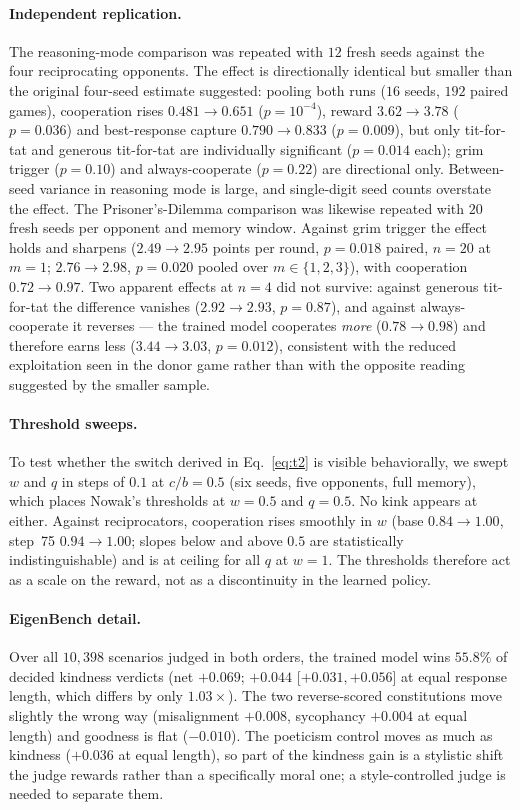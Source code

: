 \documentclass{article}
\begin{document}
\paragraph{Independent replication.} The reasoning-mode comparison was
repeated with $12$ fresh seeds against the four reciprocating opponents. The
effect is directionally identical but smaller than the original four-seed
estimate suggested: pooling both runs ($16$ seeds, $192$ paired games),
cooperation rises $0.481\to0.651$ ($p{=}10^{-4}$), reward $3.62\to3.78$
($p{=}0.036$) and best-response capture $0.790\to0.833$ ($p{=}0.009$), but
only tit-for-tat and generous tit-for-tat are individually significant
($p{=}0.014$ each); grim trigger ($p{=}0.10$) and always-cooperate
($p{=}0.22$) are directional only. Between-seed variance in reasoning mode is
large, and single-digit seed counts overstate the effect. The
Prisoner's-Dilemma comparison was likewise repeated with $20$ fresh seeds per
opponent and memory window. Against grim
trigger the effect holds and sharpens ($2.49\to2.95$ points per round,
$p{=}0.018$ paired, $n{=}20$ at $m{=}1$; $2.76\to2.98$, $p{=}0.020$ pooled
over $m\in\{1,2,3\}$), with cooperation $0.72\to0.97$. Two apparent effects at
$n{=}4$ did not survive: against generous tit-for-tat the difference vanishes
($2.92\to2.93$, $p{=}0.87$), and against always-cooperate it reverses --- the
trained model cooperates \emph{more} ($0.78\to0.98$) and therefore earns less
($3.44\to3.03$, $p{=}0.012$), consistent with the reduced exploitation seen in
the donor game rather than with the opposite reading suggested by the smaller
sample.

\paragraph{Threshold sweeps.} To test whether the switch derived in
Eq.~\ref{eq:t2} is visible behaviorally, we swept $w$ and $q$ in steps of
$0.1$ at $c/b=0.5$ (six seeds, five opponents, full memory), which places
Nowak's thresholds at $w=0.5$ and $q=0.5$. No kink appears at either. Against
reciprocators, cooperation rises smoothly in $w$ (base $0.84\to1.00$, step~75
$0.94\to1.00$; slopes below and above $0.5$ are statistically
indistinguishable) and is at ceiling for all $q$ at $w=1$. The thresholds
therefore act as a scale on the reward, not as a discontinuity in the learned
policy.

\paragraph{EigenBench detail.} Over all $10{,}398$ scenarios judged in both
orders, the trained model wins $55.8\%$ of decided kindness verdicts (net
$+0.069$; $+0.044$ [$+0.031,+0.056$] at equal response length, which differs by
only $1.03\times$). The two reverse-scored constitutions move slightly the
wrong way (misalignment $+0.008$, sycophancy $+0.004$ at equal length) and
goodness is flat ($-0.010$). The poeticism control moves as much as kindness
($+0.036$ at equal length), so part of the kindness gain is a stylistic shift
the judge rewards rather than a specifically moral one; a style-controlled
judge is needed to separate them.
\end{document}
